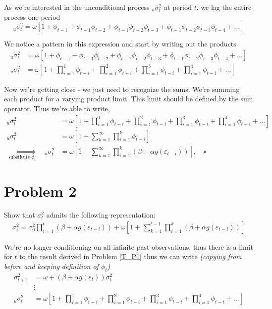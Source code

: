 \documentclass{EconHomework}
\begin{document}
As we're interested in the unconditional process $_{u}\sigma_{t}^{2}$
at period $t$, we lag the entire process one period
\[
    _{u}\sigma_{t}^{2}=\omega\left[1+\phi_{t-1}+\phi_{t-1}\phi_{t-2}+\phi_{t-1}\phi_{t-2}\phi_{t-3}+\phi_{t-1}\phi_{t-2}\phi_{t-3}\phi_{t-4}+\dots\right]
\]

We notice a pattern in this expression and start by writing out the
products
\begin{align*}
    _{u}\sigma_{t}^{2} & =\omega\left[1+\phi_{t-1}+\phi_{t-1}\phi_{t-2}+\phi_{t-1}\phi_{t-2}\phi_{t-3}+\phi_{t-1}\phi_{t-2}\phi_{t-3}\phi_{t-4}+\dots\right]\\
    _{u}\sigma_{t}^{2} & =\omega\left[1+\prod_{i=1}^{1}\phi_{t-i}+\prod_{i=1}^{2}\phi_{t-i}+\prod_{i=1}^{3}\phi_{t-i}+\prod_{i=1}^{4}\phi_{t-i}+\dots\right]
\end{align*}

Now we're getting close - we just need to recognize the sums. We're
summing each product for a varying product limit. This limit should
be defined by the sum operator. Thus we're able to write,
\begin{align*}
    _{u}\sigma_{t}^{2} & =\omega\left[1+\prod_{i=1}^{1}\phi_{t-i}+\prod_{i=1}^{2}\phi_{t-i}+\prod_{i=1}^{3}\phi_{t-i}+\prod_{i=1}^{4}\phi_{t-i}+\dots\right]\\
    _{u}\sigma_{t}^{2} & =\omega\left[1+\sum_{k=1}^{\infty}\prod_{i=1}^{k}\phi_{t-i}\right]\\
    \underset{\text{substitute }\phi_{t}}{\Longrightarrow}\quad{}_{u}\sigma_{t}^{2} & =\omega\left[1+\sum_{k=1}^{\infty}\prod_{i=1}^{k}\left(\beta+\alpha g\left(\varepsilon_{t-i}\right)\right)\right],\quad\square
\end{align*}


\section{Problem 2}

\begin{tcolorbox}[colback=white]
    Show that $\sigma_{t}^{2}$ admits the following representation:
    \begin{align*}
        \sigma_{t}^{2}=\sigma_{0}^{2} \prod_{i=1}^{t}\left(\beta+\alpha g\left(\varepsilon_{t-i}\right)\right)+\omega\left[1+\sum_{k=1}^{t-1} \prod_{i=1}^{k}\left(\beta+\alpha g\left(\varepsilon_{t-i}\right)\right)\right]
    \end{align*}
\end{tcolorbox}


We're no longer conditioning on all infinite past observations, thus
there is a limit for $t$ to the result derived in Problem \ref{T_P1}
thus we can write \textit{(copying from before and keeping definition
of $\phi_{t}$)}
\begin{align*}
\sigma_{t+1}^{2} & =\omega+\left(\beta+\alpha g\left(\varepsilon_{t}\right)\right)\sigma_{t}^{2}\\
 & \vdots\\
_{u}\sigma_{t}^{2} & =\omega\left[1+\prod_{i=1}^{1}\phi_{t-i}+\prod_{i=1}^{2}\phi_{t-i}+\prod_{i=1}^{3}\phi_{t-i}+\prod_{i=1}^{4}\phi_{t-i}+\dots\right]
\end{align*}
\end{document}
